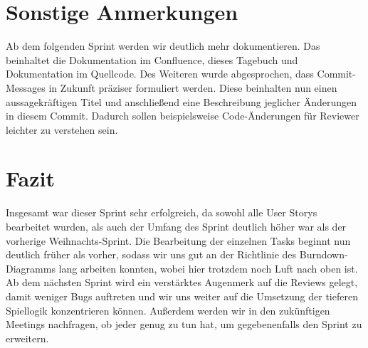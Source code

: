 \documentclass[12pt,a4paper, oneside]{article}
\begin{document}
    \section{Sonstige Anmerkungen}
    Ab dem folgenden Sprint werden wir deutlich mehr dokumentieren. Das beinhaltet die Dokumentation im Confluence, dieses Tagebuch und Dokumentation im Quellcode.
    Des Weiteren wurde abgesprochen, dass Commit-Messages in Zukunft präziser formuliert werden. Diese beinhalten nun einen aussagekräftigen Titel und anschließend eine Beschreibung jeglicher Änderungen in diesem Commit. Dadurch sollen beispielsweise Code-Änderungen für Reviewer leichter zu verstehen sein.


    \section{Fazit}
    Insgesamt war dieser Sprint sehr erfolgreich, da sowohl alle User Storys bearbeitet wurden, als auch der Umfang des Sprint deutlich höher war als der vorherige Weihnachts-Sprint. Die Bearbeitung der einzelnen Tasks beginnt nun deutlich früher als vorher, sodass wir uns gut an der Richtlinie des Burndown-Diagramms lang arbeiten konnten, wobei hier trotzdem noch Luft nach oben ist. Ab dem nächsten Sprint wird ein verstärktes Augenmerk auf die Reviews gelegt, damit weniger Bugs auftreten und wir uns weiter auf die Umsetzung der tieferen Spiellogik konzentrieren können. Außerdem werden wir in den zukünftigen Meetings nachfragen, ob jeder genug zu tun hat, um gegebenenfalls den Sprint zu erweitern.
\end{document}
